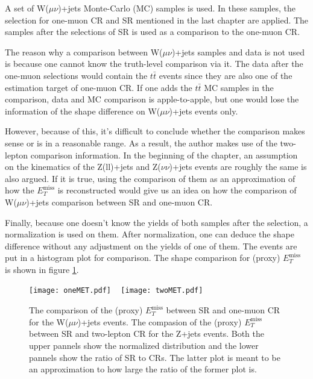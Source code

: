 \documentclass[class=NCU_thesis, crop=false]{standalone}
\begin{document}
		A set of W($\mu \nu$)+jets Monte-Carlo (MC) samples is used. In these samples, the selection for one-muon CR and SR mentioned in the last chapter are applied. The samples after the selections of SR is used as a comparison to the one-muon CR.
		
		The reason why a comparison between W($\mu \nu$)+jets samples and data is not used is because one cannot know the truth-level comparison via it. The data after the one-muon selections would contain the $t\bar{t}$ events since they are also one of the estimation target of one-muon CR. If one adds the $t\bar{t}$ MC samples in the comparison, data and MC comparison is apple-to-apple, but one would lose the information of the shape difference on W($\mu \nu$)+jets events only. 
		
		However, because of this, it's difficult to conclude whether the comparison makes sense or is in a reasonable range. As a result, the author makes use of the two-lepton comparison information. In the beginning of the chapter, an assumption on the kinematics of the Z(ll)+jets and Z($\nu \nu$)+jets events are roughly the same is also argued. If it is true, using the comparison of them as an approximation of how the $E_T^{\mathrm{miss}}$ is reconstructed would give us an idea on how the comparison of W($\mu \nu$)+jets comparison between SR and one-muon CR.

		Finally, because one doesn't know the yields of both samples after the selection, a normalization is used on them. After normalization, one can deduce the shape difference without any adjustment on the yields of one of them. The events are put in a histogram plot for comparison. The shape comparison for (proxy) $E_T^{\mathrm{miss}}$ is shown in figure \ref{fig:MET_comparison}.

		\begin{figure}[!hbt]
			\centering
			\subcaptionbox
			{\label{fig:subfig_onePTV}}
			{\texttt{[image: oneMET.pdf]}}
			~
			\subcaptionbox
			{\label{fig:subfig_twoPTV}}
			{\texttt{[image: twoMET.pdf]}}
			\caption{The comparison of the (proxy) $E_T^{\mathrm{miss}}$ between SR and one-muon CR for the W($\mu \nu$)+jets events. The compasion of the (proxy) $E_T^{\mathrm{miss}}$ between SR and two-lepton CR for the Z+jets events. Both the upper pannels show the normalized distribution and the lower pannels show the ratio of SR to CRs. The latter plot is meant to be an approximation to how large the ratio of the former plot is.}
			\label{fig:MET_comparison}
		\end{figure}
	
\end{document}
